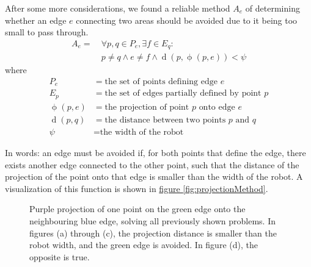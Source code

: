 \documentclass[10pt, abstracton, twocolumn]{scrartcl}
\DeclareMathOperator{\dist}{d}
\DeclareMathOperator{\proj}{\phi}
\newcommand{\fref}[1]{\hyperref[#1]{figure \vref{#1}}}
\begin{document}
\begin{samepage}

After some more considerations, we found a reliable method $A_e$ of determining whether an edge $e$ connecting two areas should be avoided due to it being too small to pass through.\textsf{}
\begin{align*}
A_e = &\ \forall p,q \in P_e, \exists f \in E_q : \\
&\ p \neq q \land e \neq f \land \dist(p,\proj(p,e)) < \psi
\end{align*}
\nopagebreak
where
\begin{align*}
P_e &= \textrm{the set of points defining edge $e$} \\
E_p &= \textrm{the set of edges partially defined by point $p$} \\
\proj(p,e) &= \textrm{the projection of point $p$ onto edge $e$} \\
\dist(p,q) &= \textrm{the distance between two points $p$ and $q$} \\
\psi &= \textrm{the width of the robot}
\end{align*}

\end{samepage}

In words: an edge must be avoided if, for both points that define the edge, there exists another edge connected to the other point, such that the distance of the projection of the point onto that edge is smaller than the width of the robot. A visualization of this function is shown in \fref{fig:projectionMethod}.

\begin{figure}[h]
        \centering
        \begin{subfigure}[t]{0.45\columnwidth}
        \centering
        
        \subcaption{\small }
        \end{subfigure}
        \begin{subfigure}[t]{0.45\columnwidth}
        \centering
        
        \subcaption{\small }
        \end{subfigure}
        \begin{subfigure}[t]{0.45\columnwidth}
        \centering
        
        \subcaption\small {}
        \end{subfigure}
        \begin{subfigure}[t]{0.45\columnwidth}
        \centering
        
        \subcaption{\small }
        \end{subfigure}
        \caption{\small Purple projection of one point on the green edge onto the neighbouring blue edge, solving all previously shown problems. In figures (a) through (c), the projection distance is smaller than the robot width, and the green edge is avoided. In figure (d), the opposite is true.}
        \label{fig:projectionMethod}
\end{figure}
\end{document}
